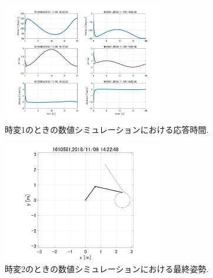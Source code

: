 \documentclass[twocolumn, 10pt,a4j]{jsarticle}
\begin{document}
\begin{enumerate}
        \begin{figure}[H]
          \begin{center}
            \includegraphics[width=7cm]{../img/kadai45/jpg_hand_zihen_auto_zikan_1.jpg}
            \caption{時変1のときの数値シミュレーションにおける応答時間.}
          \end{center}
        \end{figure}
        \begin{figure}[H]
          \begin{center}
            \includegraphics[width=7cm]{../img/kadai45/jpg_hand_zihen_saisyu_sise_2.jpg}
            \caption{時変2のときの数値シミュレーションにおける最終姿勢.}
          \end{center}
        \end{figure}
        

\end{enumerate}
\end{document}
